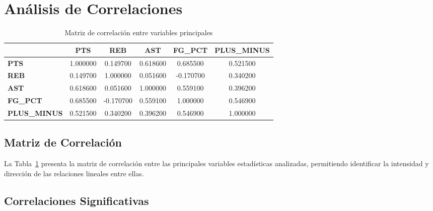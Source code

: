 \documentclass[12pt]{article}
\begin{document}
\section{Análisis de Correlaciones}

\begin{table}[H]
\centering
\caption{Matriz de correlación entre variables principales}
\label{tab:correlacion}
\begin{tabular}{lccccc}
\toprule
 & PTS & REB & AST & FG\_PCT & PLUS\_MINUS \\
\midrule
\textbf{PTS} & 1.000000 & 0.149700 & 0.618600 & 0.685500 & 0.521500 \\
\textbf{REB} & 0.149700 & 1.000000 & 0.051600 & -0.170700 & 0.340200 \\
\textbf{AST} & 0.618600 & 0.051600 & 1.000000 & 0.559100 & 0.396200 \\
\textbf{FG\_PCT} & 0.685500 & -0.170700 & 0.559100 & 1.000000 & 0.546900 \\
\textbf{PLUS\_MINUS} & 0.521500 & 0.340200 & 0.396200 & 0.546900 & 1.000000 \\
\bottomrule
\end{tabular}
\end{table}


\subsection{Matriz de Correlación}

La Tabla~\ref{tab:correlacion} presenta la matriz de correlación entre las principales variables estadísticas analizadas, permitiendo identificar la intensidad y dirección de las relaciones lineales entre ellas.

\subsection{Correlaciones Significativas}
\end{document}

